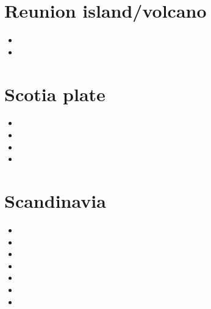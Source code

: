 
\section{Reunion island/volcano}

\begin{small}
\begin{itemize}
\item[\twothousandseventeen]
\item[\twothousandtwentytwo]
\end{itemize}
\end{small}


\section{Scotia plate}

\begin{small}
\begin{itemize}
\item[\twothousandthirteen]
\item[\twothousandtwenty]
\item[\twothousandtwentyone]
\item[\twothousandtwentythree]
\end{itemize}
\end{small}

\section{Scandinavia}

\begin{small}
\begin{itemize}
\item[\nineteeneighty] 
\item[\twothousandfive]
\item[\twothousandeight]
\item[\twothousandthirteen]
\item[\twothousandfourteen] 
\item[\twothousandfifteen] 
\item[\twothousand]
\end{itemize}
\end{small}


